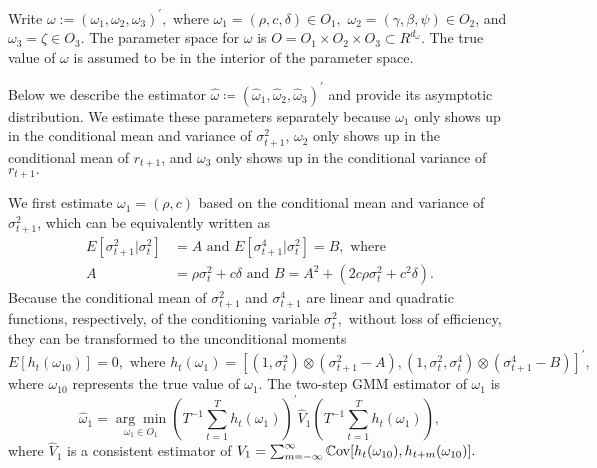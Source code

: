 \documentclass[11pt, letterpaper, twoside]{article}
\begin{document}
Write $\omega :=(\omega _{1},\omega _{2},\omega _{3})^{\prime },$ where $\omega _{1}=(\rho ,c,\delta )\in O_{1},$ $\omega _{2}=(\gamma ,\beta ,\psi) \in O_{2}$, and $\omega _{3}=\zeta \in O_{3}.$ The parameter space for $ \omega $ is $O=O_{1}\times O_{2}\times O_{3}\subset R^{d_{\omega }}$. The true value of $\omega $ is assumed to be in the interior of the parameter
space.

Below we describe the estimator $\widehat{\omega } \coloneqq (\widehat{\omega }_{1}, \widehat{\omega }_{2},\widehat{\omega }_{3})^{\prime }$ and provide its asymptotic distribution. We estimate these parameters separately because $\omega _{1}$ only shows up in the conditional mean and variance of $\sigma _{t+1}^{2}$, $\omega_{2}$ only shows up in the conditional mean of $r_{t+1}$, and $\omega _{3}$ only shows up in the conditional variance of $
r_{t+1}.$

We first estimate $\omega _{1}=(\rho ,c)$ based on the conditional mean and variance of $\sigma _{t+1}^{2}$, which can be equivalently written as 
%
\begin{align}
    E[\sigma _{t+1}^{2}|\sigma _{t}^{2}] &= A\text{ and }E[\sigma _{t+1}^{4}|\sigma _{t}^{2}]=B,\text{ where }  \nonumber \\
%
    A &= \rho \sigma _{t}^{2}+c\delta \text{ and }B=A^{2}+\left( 2c\rho \sigma _{t}^{2}+c^{2}\delta \right) .
\end{align}
%
Because the conditional mean of $\sigma _{t+1}^{2}$ and $\sigma _{t+1}^{4}$ are linear and quadratic functions, respectively, of the conditioning variable $\sigma _{t}^{2},$ without loss of efficiency, they can be transformed to the unconditional moments
%
\begin{equation}
    E[h_{t}(\omega _{10})]=0,\text{ where }h_{t}(\omega _{1})=[(1,\sigma _{t}^{2})\otimes (\sigma _{t+1}^{2}-A),(1,\sigma _{t}^{2},\sigma _{t}^{4})\otimes (\sigma _{t+1}^{4}-B)]^{\prime },
\end{equation}
%
where $\omega _{10}$ represents the true value of $\omega _{1}$. The two-step GMM estimator of $\omega _{1}$ is%
%
\begin{equation}
    \widehat{\omega }_{1}=\underset{\omega _{1}\in O_{1}}{\arg \min }\left( T^{-1}\sum_{t=1}^{T}h_{t}(\omega _{1})\right) ^{\prime }\widehat{V}_{1}\left( T^{-1}\sum_{t=1}^{T}h_{t}(\omega _{1})\right) ,
    \label{omega 1 est}
\end{equation}%
%
where $\widehat{V}_{1}$ is a consistent estimator of $V_{1}=\sum_{m=-\infty }^{\infty }\operatorname{\mathbb{C}ov}[h_{t}(\omega _{10}),h_{t+m}(\omega _{10})].$
\end{document}
